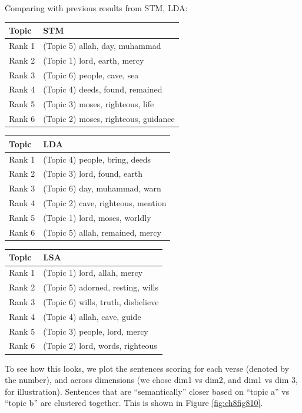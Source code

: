 \documentclass[
]{article}
\begin{document}
Comparing with previous results from STM, LDA:

\begin{longtable}[]{@{}ll@{}}
\toprule\noalign{}
Topic & STM \\
\midrule\noalign{}
\endhead
\bottomrule\noalign{}
\endlastfoot
Rank 1 & (Topic 5) allah, day, muhammad \\
Rank 2 & (Topic 1) lord, earth, mercy \\
Rank 3 & (Topic 6) people, cave, sea \\
Rank 4 & (Topic 4) deeds, found, remained \\
Rank 5 & (Topic 3) moses, righteous, life \\
Rank 6 & (Topic 2) moses, righteous, guidance \\
\end{longtable}

\begin{longtable}[]{@{}ll@{}}
\toprule\noalign{}
Topic & LDA \\
\midrule\noalign{}
\endhead
\bottomrule\noalign{}
\endlastfoot
Rank 1 & (Topic 4) people, bring, deeds \\
Rank 2 & (Topic 3) lord, found, earth \\
Rank 3 & (Topic 6) day, muhammad, warn \\
Rank 4 & (Topic 2) cave, righteous, mention \\
Rank 5 & (Topic 1) lord, moses, worldly \\
Rank 6 & (Topic 5) allah, remained, mercy \\
\end{longtable}

\begin{longtable}[]{@{}ll@{}}
\toprule\noalign{}
Topic & LSA \\
\midrule\noalign{}
\endhead
\bottomrule\noalign{}
\endlastfoot
Rank 1 & (Topic 1) lord, allah, mercy \\
Rank 2 & (Topic 5) adorned, resting, wills \\
Rank 3 & (Topic 6) wills, truth, disbelieve \\
Rank 4 & (Topic 4) allah, cave, guide \\
Rank 5 & (Topic 3) people, lord, mercy \\
Rank 6 & (Topic 2) lord, words, righteous \\
\end{longtable}

To see how this looks, we plot the sentences scoring for each verse (denoted by the number), and across dimensions (we chose dim1 vs dim2, and dim1 vs dim 3, for illustration). Sentences that are ``semantically'' closer based on ``topic a'' vs ``topic b'' are clustered together. This is shown in Figure \ref{fig:ch8fig810}.
\end{document}
